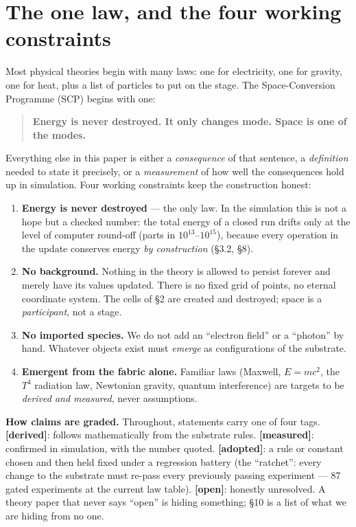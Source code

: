 \twocolumn
\setlength{\emergencystretch}{3em}

\section{The one law, and the four working
constraints}\label{the-one-law-and-the-four-working-constraints}

Most physical theories begin with many laws: one for electricity, one
for gravity, one for heat, plus a list of particles to put on the stage.
The Space-Conversion Programme (SCP) begins with one:

\begin{quote}
\textbf{Energy is never destroyed. It only changes mode. Space is one of
the modes.}
\end{quote}

Everything else in this paper is either a \emph{consequence} of that
sentence, a \emph{definition} needed to state it precisely, or a
\emph{measurement} of how well the consequences hold up in simulation.
Four working constraints keep the construction honest:

\begin{enumerate}
\def\labelenumi{\arabic{enumi}.}
\tightlist
\item
  \textbf{Energy is never destroyed} --- the only law. In the simulation
  this is not a hope but a checked number: the total energy of a closed
  run drifts only at the level of computer round-off (parts in
  \(10^{13}\)--\(10^{15}\)), because every operation in the update
  conserves energy \emph{by construction} (§3.2, §8).
\item
  \textbf{No background.} Nothing in the theory is allowed to persist
  forever and merely have its values updated. There is no fixed grid of
  points, no eternal coordinate system. The cells of §2 are created and
  destroyed; space is a \emph{participant}, not a stage.
\item
  \textbf{No imported species.} We do not add an ``electron field'' or a
  ``photon'' by hand. Whatever objects exist must \emph{emerge} as
  configurations of the substrate.
\item
  \textbf{Emergent from the fabric alone.} Familiar laws (Maxwell,
  \(E=mc^2\), the \(T^4\) radiation law, Newtonian gravity, quantum
  interference) are targets to be \emph{derived and measured}, never
  assumptions.
\end{enumerate}

\textbf{How claims are graded.} Throughout, statements carry one of four
tags. \textbf{{[}derived{]}}: follows mathematically from the substrate
rules. \textbf{{[}measured{]}}: confirmed in simulation, with the number
quoted. \textbf{{[}adopted{]}}: a rule or constant chosen and then held
fixed under a regression battery (the ``ratchet'': every change to the
substrate must re-pass every previously passing experiment --- 87 gated
experiments at the current law table). \textbf{{[}open{]}}: honestly
unresolved. A theory paper that never says ``open'' is hiding something;
§10 is a list of what we are hiding from no one.

